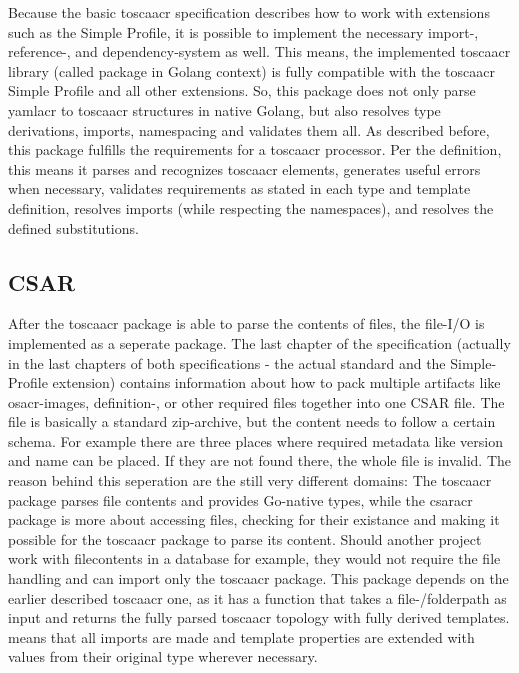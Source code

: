 Because the basic \gls{toscaacr} specification describes how to work with extensions such as the Simple Profile, it is possible to implement the necessary import-, reference-, and dependency-system as well. This means, the implemented \gls{toscaacr} library (called package in Golang context) is fully compatible with the \gls{toscaacr} Simple Profile and all other extensions.
\newline
So, this package does not only parse \gls{yamlacr} to \gls{toscaacr} structures in native Golang, but also resolves type derivations, imports, namespacing and validates them all.
\newline
As described before, this package fulfills the requirements for a \gls{toscaacr} processor. Per the definition, this means it parses and recognizes \gls{toscaacr} elements, generates useful errors when necessary, validates requirements as stated in each type and template definition, resolves imports (while respecting the namespaces), and resolves the defined substitutions.


\subsection{CSAR}
After the \gls{toscaacr} package is able to parse the contents of files, the file-I/O is implemented as a seperate package. The last chapter of the specification (actually in the last chapters of both specifications - the actual standard and the Simple-Profile extension) contains information about how to pack multiple artifacts like \gls{osacr}-images, definition-, or other required files together into one CSAR file. The file is basically a standard zip-archive, but the content needs to follow a certain schema. For example there are three places where required metadata like version and name can be placed. If they are not found there, the whole file is invalid.
\newline
The reason behind this seperation are the still very different domains: The \gls{toscaacr} package parses file contents and provides Go-native types, while the \gls{csaracr} package is more about accessing files, checking for their existance and making it possible for the \gls{toscaacr} package to parse its content. Should another project work with filecontents in a database for example, they would not require the file handling and can import only the \gls{toscaacr} package.
\newline
This package depends on the earlier described \gls{toscaacr} one, as it has a function that takes a file-/folderpath as input and returns the fully parsed \gls{toscaacr} topology with fully derived templates.  means that all imports are made and template properties are extended with values from their original type wherever necessary.

